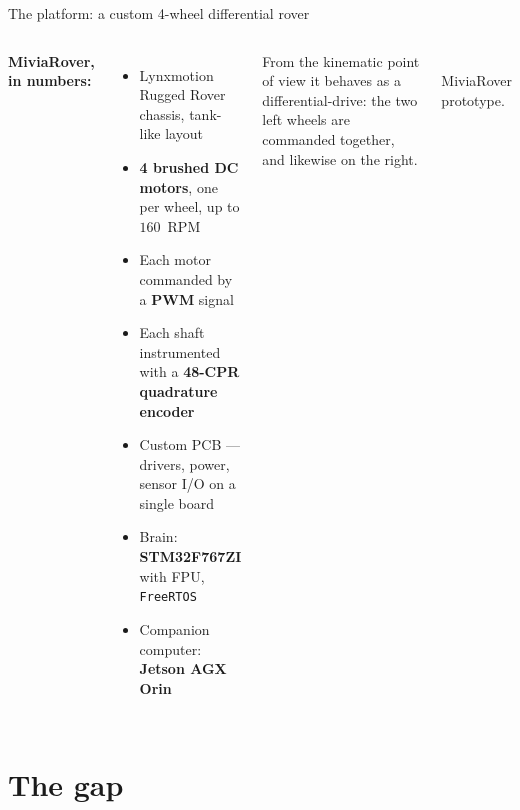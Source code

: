 \begin{frame}{The platform: a custom 4-wheel differential rover}
  \begin{columns}[T,onlytextwidth]
      \textbf{MiviaRover, in numbers:}
      \begin{itemize}\setlength\itemsep{2pt}
        \item Lynxmotion Rugged Rover chassis, tank-like layout
        \item \textbf{4 brushed DC motors}, one per wheel, up to \(160\)~RPM
        \item Each motor commanded by a \textbf{PWM} signal
        \item Each shaft instrumented with a \textbf{48-CPR quadrature encoder}
        \item Custom PCB — drivers, power, sensor I/O on a single board
        \item Brain: \textbf{STM32F767ZI} with FPU, \texttt{FreeRTOS}
        \item Companion computer: \textbf{Jetson AGX Orin}
      \end{itemize}

      \vspace{0.4em}
      \footnotesize\textcolor{black!60}{From the kinematic point of view it
      behaves as a differential-drive: the two left wheels are commanded
      together, and likewise on the right.}

      \centering
      \\\scriptsize MiviaRover prototype.
  \end{columns}
\end{frame}

\section{The gap}


